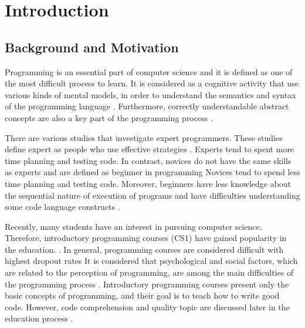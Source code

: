 %
%

\chapter{Introduction}
\label{sec:introduction}


\section{Background and Motivation}

Programming is an essential part of computer science and it is defined as one of the most difficult process to learn. \cite{andrzejewska2020development} It is considered as a cognitive activity that use various kinds of mental models, in order to understand the semantics and syntax of the programming language \cite{andrzejewska2020development}.
Furthermore, correctly understandable abstract concepts are also a key part of the programming process \cite{lahtinen2005study}.

There are various studies that investigate expert programmers. These studies define expert as people who use effective strategies \cite{robins2003learning}.   Experts tend to spent more time planning and testing code. In contrast, novices do not have the same skills as experts and are defined as beginner in programming \cite{robins2003learning} Novices tend to spend less time planning and testing code. Moreover, beginners have less knowledge about the sequential nature of execution of programs and have difficulties understanding some code language constructs \cite{robins2003learning}.


Recently, many students have an interest in pursuing computer science. Therefore, introductory programming courses (CS1) have gained popularity in the education. \cite{robins2003learning}. In general, programming courses are considered difficult with highest dropout rates \cite{robins2003learning} It is considered that psychological and social factors, which are related to the perception of programming, are among the main difficulties of the programming process \cite{andrzejewska2020development}. Introductory programming courses present only the basic concepts of programming, and their goal is to teach how to write good code. However, code comprehension and quality topic are discussed later in the education process \cite{ inproceedings}.

